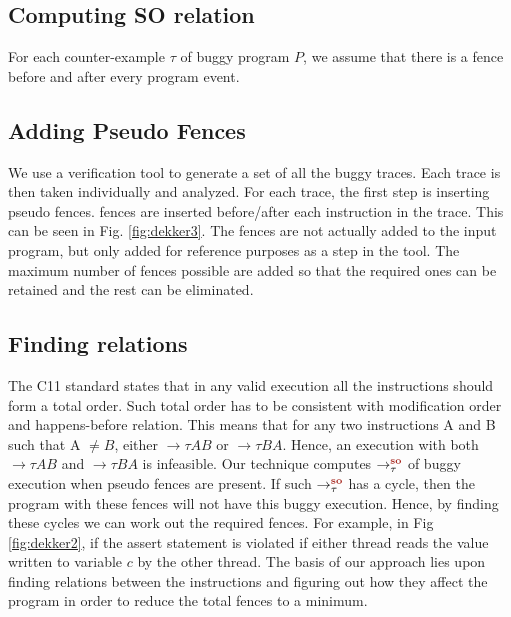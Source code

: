 \subsection{Computing SO relation}
For each counter-example $ \tau $ of buggy program $ P $, we assume that 
there is a \mosc fence before and after every program event.


\subsection{Adding Pseudo Fences}
\par
We use a verification tool to generate a set of all the buggy traces. 
Each trace is then taken individually and analyzed. For each trace, 
the first step is inserting pseudo fences. \mosc fences are inserted 
before/after each instruction in the trace. This can be seen in 
Fig. \ref{fig:dekker3}. The fences are not actually added to the 
input program, but only added for reference purposes as a step in 
the tool. The maximum number of fences possible are added so that 
the required ones can be retained and the rest can be eliminated.

\subsection{Finding relations}
The C11 standard \cite{C11} states that in any valid execution 
all the \mosc instructions should form a total order. Such total order
has to be consistent with modification order and 
happens-before relation. This means that for any two \mosc instructions A 
and B such that A $ \neq B $, either $\to{\tau}{A}{B}$ or $\to{\tau}{B}{A}$. 
Hence, an execution with both $\to{\tau}{A}{B}$ and $\to{\tau}{B}{A}$ is infeasible.
Our technique computes $\setSO$ of buggy execution when pseudo fences are 
present. If such $\setSO$ has a cycle, then the program with these fences 
will not have this buggy execution. 
Hence, by finding these cycles we can work out the required fences.
For example, in Fig \ref{fig:dekker2}, if the assert statement is violated
if either thread reads the value written to variable $c$ by the other thread.
The basis of our approach lies upon finding relations between the 
instructions and figuring out how they affect the program in order to 
reduce the total fences to a minimum. 

